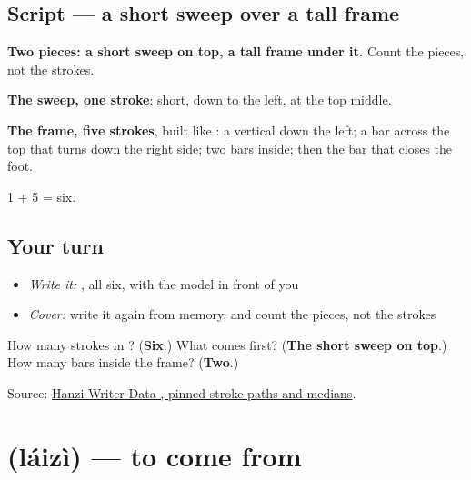 \subsection*{Script — a short sweep over a tall frame}

\begin{quote}
\end{quote}

\textbf{Two pieces: a short sweep on top, a tall frame under it.} Count the pieces, not the strokes.

\textbf{The sweep, one stroke}: short, down to the left, at the top middle.

\textbf{The frame, five strokes}, built like : a vertical down the left; a bar across the top that turns down the right side; two bars inside; then the bar that closes the foot.

1 + 5 = six.

\subsection*{Your turn}
\begin{itemize}
\raggedright
  \item \emph{Write it:} , all six, with the model in front of you
  \item \emph{Cover:} write it again from memory, and count the pieces, not the strokes
\end{itemize}

\begin{tcolorbox}[breakable,colback=teal!4,colframe=teal!35!black,title={Before you move on}]
How many strokes in ? (\textbf{Six}.) What comes first? (\textbf{The short sweep on top}.) How many bars inside the frame? (\textbf{Two}.)

Source: \href{https://raw.githubusercontent.com/chanind/hanzi-writer-data/68d10a4b21150cae5e1ebbd223eed289cf32d90c/data/\%E8\%87\%AA.json}{Hanzi Writer Data , pinned stroke paths and medians}.
\end{tcolorbox}
\section[\texorpdfstring{\zh{来自} (láizì)}{来自 (láizì)}]{ (láizì) — to come from}

\label{lesson:ZH-C308-laizi}



